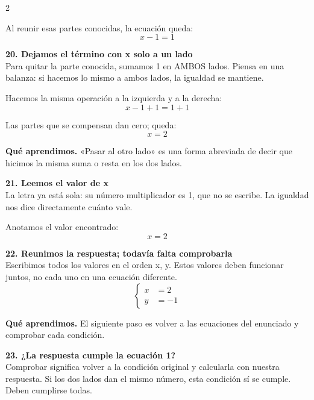 \documentclass[11pt,a4paper,landscape]{article}
\begin{document}
\begin{multicols*}{2}
\begin{minipage}{\linewidth}
\par\smallskip Al reunir esas partes conocidas, la ecuación queda:
\[x - 1=1\]
\end{minipage}\par\medskip
\noindent\begin{minipage}{\linewidth}\textbf{20. Dejamos el término con x solo a un lado}\\[2pt]Para quitar la parte conocida, sumamos 1 en AMBOS lados. Piensa en una balanza: si hacemos lo mismo a ambos lados, la igualdad se mantiene.
\par\smallskip Hacemos la misma operación a la izquierda y a la derecha:
\[x - 1 + 1=1 + 1\]
\par\smallskip Las partes que se compensan dan cero; queda:
\[x=2\]
\par\smallskip\textbf{Qué aprendimos.} «Pasar al otro lado» es una forma abreviada de decir que hicimos la misma suma o resta en los dos lados.
\end{minipage}\par\medskip
\noindent\begin{minipage}{\linewidth}\textbf{21. Leemos el valor de x}\\[2pt]La letra ya está sola: su número multiplicador es 1, que no se escribe. La igualdad nos dice directamente cuánto vale.
\par\smallskip Anotamos el valor encontrado:
\[x=2\]
\end{minipage}\par\medskip
\noindent\begin{minipage}{\linewidth}\textbf{22. Reunimos la respuesta; todavía falta comprobarla}\\[2pt]Escribimos todos los valores en el orden x, y. Estos valores deben funcionar juntos, no cada uno en una ecuación diferente.
\[\left\{\begin{aligned}x&=2\\y&=-1\end{aligned}\right.\]
\par\smallskip\textbf{Qué aprendimos.} El siguiente paso es volver a las ecuaciones del enunciado y comprobar cada condición.
\end{minipage}\par\medskip
\noindent\begin{minipage}{\linewidth}\textbf{23. ¿La respuesta cumple la ecuación 1?}\\[2pt]Comprobar significa volver a la condición original y calcularla con nuestra respuesta. Si los dos lados dan el mismo número, esta condición sí se cumple. Deben cumplirse todas.

\end{minipage}
\end{multicols*}
\end{document}
